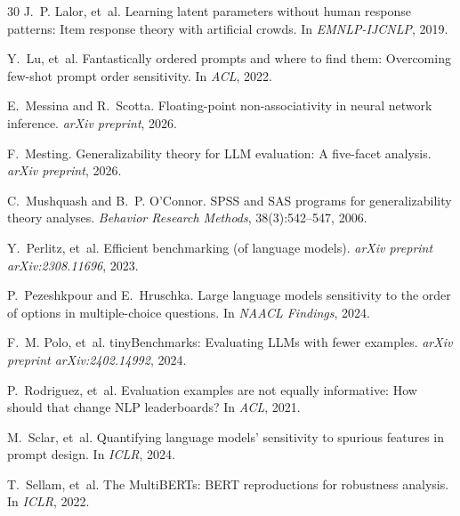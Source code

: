 \documentclass[letterpaper]{article}
\begin{document}
\begin{thebibliography}{30}
J.~P. Lalor, et~al.
\newblock Learning latent parameters without human response patterns: Item response theory with artificial crowds.
\newblock In \emph{EMNLP-IJCNLP}, 2019.

Y.~Lu, et~al.
\newblock Fantastically ordered prompts and where to find them: Overcoming few-shot prompt order sensitivity.
\newblock In \emph{ACL}, 2022.

E.~Messina and R.~Scotta.
\newblock Floating-point non-associativity in neural network inference.
\newblock \emph{arXiv preprint}, 2026.

F.~Mesting.
\newblock Generalizability theory for LLM evaluation: A five-facet analysis.
\newblock \emph{arXiv preprint}, 2026.

C.~Mushquash and B.~P. O'Connor.
\newblock SPSS and SAS programs for generalizability theory analyses.
\newblock \emph{Behavior Research Methods}, 38(3):542--547, 2006.

Y.~Perlitz, et~al.
\newblock Efficient benchmarking (of language models).
\newblock \emph{arXiv preprint arXiv:2308.11696}, 2023.

P.~Pezeshkpour and E.~Hruschka.
\newblock Large language models sensitivity to the order of options in multiple-choice questions.
\newblock In \emph{NAACL Findings}, 2024.

F.~M. Polo, et~al.
\newblock tinyBenchmarks: Evaluating LLMs with fewer examples.
\newblock \emph{arXiv preprint arXiv:2402.14992}, 2024.

P.~Rodriguez, et~al.
\newblock Evaluation examples are not equally informative: How should that change NLP leaderboards?
\newblock In \emph{ACL}, 2021.

M.~Sclar, et~al.
\newblock Quantifying language models' sensitivity to spurious features in prompt design.
\newblock In \emph{ICLR}, 2024.

T.~Sellam, et~al.
\newblock The MultiBERTs: BERT reproductions for robustness analysis.
\newblock In \emph{ICLR}, 2022.


\end{thebibliography}
\end{document}
